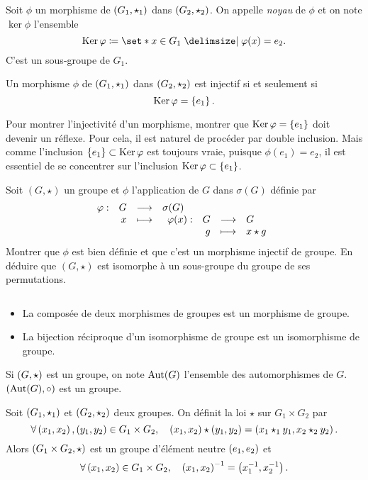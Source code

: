 \documentclass{magnolia}
\begin{document}
\begin{definition}
Soit $\phi$ un morphisme de $\left(G_1,\star_1\right)$ dans $\left(G_2,\star_2\right)$. On
appelle \emph{noyau} de $\phi$ et on note $\ker\phi$ l'ensemble
\[\ker\phi\defeq\enstq{x\in G_1}{\phi(x)=e_2}.\]
C'est un sous-groupe de $G_1$.
\end{definition}

\begin{proposition}
Un morphisme $\phi$ de $\left(G_1,\star_1\right)$ dans $\left(G_2,\star_2\right)$ est injectif
si et seulement si
\[\mathop{\rm Ker}\varphi=\left\{e_1\right\}.\]
\end{proposition}

\begin{remarqueUnique}
\remarque Pour montrer l'injectivité d'un morphisme, montrer que $\mathop{\rm Ker}\varphi=\left\{e_1\right\}$ doit
  devenir un réflexe. Pour cela, il est naturel de procéder par double
  inclusion. Mais comme l'inclusion $\left\{e_1\right\}\subset\mathop{\rm Ker}\varphi$
  est toujours vraie, puisque $\phi(e_1)=e_2$, il est essentiel de se concentrer sur
  l'inclusion $\mathop{\rm Ker}\varphi\subset\left\{e_1\right\}$.
\end{remarqueUnique}


\begin{exoUnique}
\exo Soit $(G,\star)$ un groupe et $\phi$ l'application de $G$ dans
  $\sigma(G)$ définie par
  \[\begin{array}[t]{lrcl} \displaystyle{\varphi} : & \displaystyle{G} & \longrightarrow & \displaystyle{\sigma(G)} \\ & \displaystyle{x} & \longmapsto & \displaystyle{\begin{array}[t]{lrcl} \displaystyle{\varphi(x)} : & \displaystyle{G} & \longrightarrow & \displaystyle{G} \\ & \displaystyle{g} & \longmapsto & \displaystyle{x\star g} \end{array}} \end{array}\]
  Montrer que $\phi$ est bien définie et que c'est un morphisme injectif de
  groupe. En déduire que $(G,\star)$ est isomorphe à un sous-groupe du groupe
  de ses permutations.
\end{exoUnique}

\begin{proposition}
$\quad$
\begin{itemize}
\item La composée de deux morphismes de groupes est un morphisme de groupe.
\item La bijection réciproque d'un isomorphisme de groupe est un isomorphisme de
  groupe.
\end{itemize}
\end{proposition}

\begin{proposition}
Si $\left(G,\star\right)$ est un groupe, on note ${\rm Aut}(G)$ l'ensemble des
automorphismes de $G$. $\left({\rm Aut}(G),\circ\right)$ est un groupe.
\end{proposition}

\begin{definition}
Soit $\left(G_1,\star_1\right)$ et $\left(G_2,\star_2\right)$ deux groupes. On définit la loi $\star$
sur $G_1\times G_2$ par
\[\forall \left(x_1,x_2\right),\left(y_1,y_2\right)\in G_1\times G_2 ,\quad
  \left(x_1,x_2\right)\star\left(y_1,y_2\right)=\left(x_1\star_1 y_1,x_2\star_2 y_2\right).\]
Alors $\left(G_1\times G_2,\star\right)$ est un groupe d'élément neutre $\left(e_1,e_2\right)$ et
\[\forall \left(x_1,x_2\right)\in G_1\times G_2 ,\quad
  \left(x_1,x_2\right)^{-1}=\left(x_1^{-1},x_2^{-1}\right).\]
\end{definition}
\end{document}
